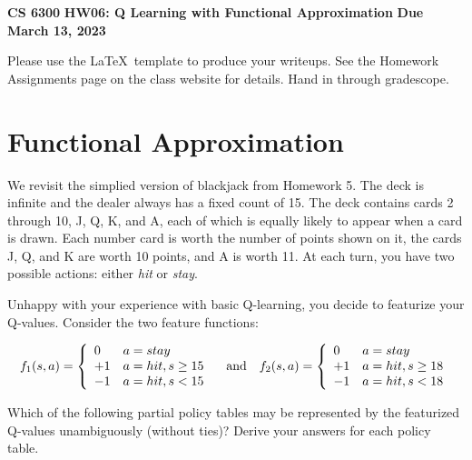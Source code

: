\documentclass[12pt]{article}
\begin{document}
\begin{center} 
{\bf CS 6300} \hfill {\large\bf HW06: Q Learning with
    Functional Approximation} \hfill {\bf Due March 13, 2023}
\end{center}

\noindent
Please use the \LaTeX\ template to produce your writeups. See the
Homework Assignments page on the class website for details.  Hand in
through gradescope.


\section{Functional Approximation}

We revisit the simplied version of blackjack from Homework 5. The deck is infinite and the
dealer always has a fixed count of 15.  The deck contains cards 2
through 10, J, Q, K, and A, each of which is equally likely to appear
when a card is drawn.  Each number card is worth the number of points
shown on it, the cards J, Q, and K are worth 10 points, and A is worth
11.  At each turn, you have two possible actions: either {\it hit} or {\it stay}.

Unhappy with your experience with basic Q-learning, you decide to
featurize your Q-values.  Consider the two feature functions:

$$
f_1(s,a) = \left\{ \begin{array}{ll}
                  0  & a=stay \\
                  +1 & a=hit, s \geq 15 \\
                 -1  & a=hit, s < 15
                 \end{array} \right.
\quad \hbox{and} \quad
f_2(s,a) = \left\{ \begin{array}{ll}
                  0  & a=stay \\
                  +1 & a=hit, s \geq 18 \\
                 -1  & a=hit, s < 18
                 \end{array} \right.
$$

\noindent
Which of the following partial policy tables may be represented by the
featurized Q-values unambiguously (without ties)?  Derive your answers
for each policy table.
\end{document}
